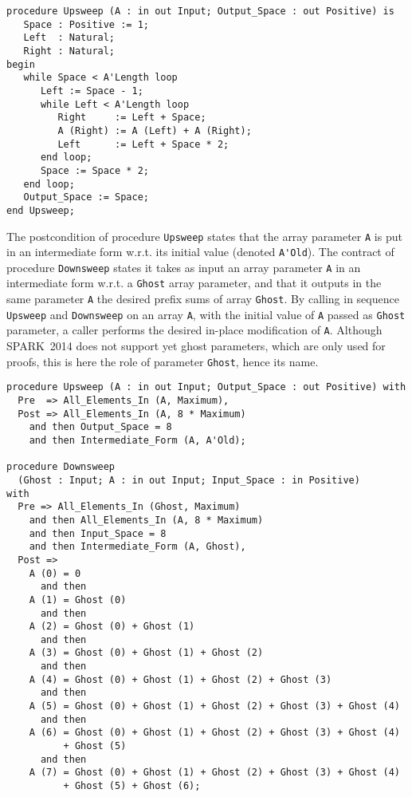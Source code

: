 \documentclass[sttt,draft]{svjour}
\newcommand{\newspark}{SPARK~2014\xspace}
\newcommand{\wrt}{w.r.t.\xspace}
\begin{document}
\begin{footnotesize}
\begin{verbatim}
procedure Upsweep (A : in out Input; Output_Space : out Positive) is
   Space : Positive := 1;
   Left  : Natural;
   Right : Natural;
begin
   while Space < A'Length loop
      Left := Space - 1;
      while Left < A'Length loop
         Right     := Left + Space;
         A (Right) := A (Left) + A (Right);
         Left      := Left + Space * 2;
      end loop;
      Space := Space * 2;
   end loop;
   Output_Space := Space;
end Upsweep;
\end{verbatim}
\end{footnotesize}

The postcondition of procedure \verb|Upsweep| states that the array parameter
\verb|A| is put in an intermediate form \wrt its initial value (denoted
\verb|A'Old|). The contract of procedure \verb|Downsweep| states it takes as
input an array parameter \verb|A| in an intermediate form \wrt a \verb|Ghost|
array parameter, and that it outputs in the same parameter \verb|A| the desired
prefix sums of array \verb|Ghost|. By calling in sequence \verb|Upsweep| and
\verb|Downsweep| on an array \verb|A|, with the initial value of \verb|A|
passed as \verb|Ghost| parameter, a caller performs the desired in-place
modification of \verb|A|. Although \newspark does not support yet ghost
parameters, which are only used for proofs, this is here the role of parameter
\verb|Ghost|, hence its name.

\begin{footnotesize}
\begin{verbatim}
procedure Upsweep (A : in out Input; Output_Space : out Positive) with
  Pre  => All_Elements_In (A, Maximum),
  Post => All_Elements_In (A, 8 * Maximum)
    and then Output_Space = 8
    and then Intermediate_Form (A, A'Old);

procedure Downsweep
  (Ghost : Input; A : in out Input; Input_Space : in Positive)
with
  Pre => All_Elements_In (Ghost, Maximum)
    and then All_Elements_In (A, 8 * Maximum)
    and then Input_Space = 8
    and then Intermediate_Form (A, Ghost),
  Post =>
    A (0) = 0
      and then
    A (1) = Ghost (0)
      and then
    A (2) = Ghost (0) + Ghost (1)
      and then
    A (3) = Ghost (0) + Ghost (1) + Ghost (2)
      and then
    A (4) = Ghost (0) + Ghost (1) + Ghost (2) + Ghost (3)
      and then
    A (5) = Ghost (0) + Ghost (1) + Ghost (2) + Ghost (3) + Ghost (4)
      and then
    A (6) = Ghost (0) + Ghost (1) + Ghost (2) + Ghost (3) + Ghost (4)
          + Ghost (5)
      and then
    A (7) = Ghost (0) + Ghost (1) + Ghost (2) + Ghost (3) + Ghost (4)
          + Ghost (5) + Ghost (6);
\end{verbatim}
\end{footnotesize}
\end{document}
